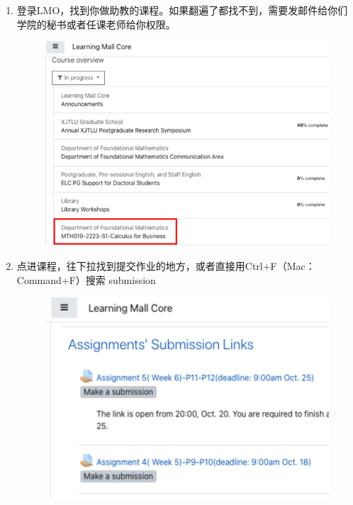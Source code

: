 \begin{enumerate}
    \item 登录LMO，找到你做助教的课程。如果翻遍了都找不到，需要发邮件给你们学院的秘书或者任课老师给你权限。
    \begin{figure}[H]
        \centering
        \includegraphics[width=0.4\columnwidth]{author-folder/Kai.Wu/LMO_course.png}
    \end{figure}

    \item 
    \begin{minipage}{0.3\textwidth}
        点进课程，往下拉找到提交作业的地方，或者直接用Ctrl+F（Mac：Command+F）搜索 submission
    \end{minipage}
    \begin{minipage}{0.63\textwidth}
        \begin{figure}[H]
            \includegraphics[width=0.95\columnwidth, right]{author-folder/Kai.Wu/LMO_submission_links.png}
        \end{figure}
    \end{minipage}


\end{enumerate}
